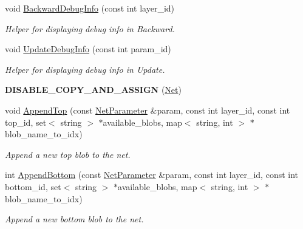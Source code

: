 \begin{DoxyCompactItemize}
\mbox{\label{classcaffe_1_1_net_a0ddec52928f0488e1b1136a0d72db0a1}} 
void \mbox{\hyperlink{classcaffe_1_1_net_a0ddec52928f0488e1b1136a0d72db0a1}{Backward\+Debug\+Info}} (const int layer\+\_\+id)
\begin{DoxyCompactList}\small\item\em Helper for displaying debug info in Backward. \end{DoxyCompactList}\item 
\mbox{\label{classcaffe_1_1_net_a93a439c92c9218f1dfff16f76d617faa}} 
void \mbox{\hyperlink{classcaffe_1_1_net_a93a439c92c9218f1dfff16f76d617faa}{Update\+Debug\+Info}} (const int param\+\_\+id)
\begin{DoxyCompactList}\small\item\em Helper for displaying debug info in Update. \end{DoxyCompactList}\item 
\mbox{\label{classcaffe_1_1_net_a3d52b2d075fa543e687cf61ba035a488}} 
{\bfseries D\+I\+S\+A\+B\+L\+E\+\_\+\+C\+O\+P\+Y\+\_\+\+A\+N\+D\+\_\+\+A\+S\+S\+I\+GN} (\mbox{\hyperlink{classcaffe_1_1_net}{Net}})
\item 
\mbox{\label{classcaffe_1_1_net_a3aab736bc72b29c84dc3ee765ee453c4}} 
void \mbox{\hyperlink{classcaffe_1_1_net_a3aab736bc72b29c84dc3ee765ee453c4}{Append\+Top}} (const \mbox{\hyperlink{classcaffe_1_1_net_parameter}{Net\+Parameter}} \&param, const int layer\+\_\+id, const int top\+\_\+id, set$<$ string $>$ $\ast$available\+\_\+blobs, map$<$ string, int $>$ $\ast$blob\+\_\+name\+\_\+to\+\_\+idx)
\begin{DoxyCompactList}\small\item\em Append a new top blob to the net. \end{DoxyCompactList}\item 
\mbox{\label{classcaffe_1_1_net_a6ef3482f4e882e437c81affa77d91f32}} 
int \mbox{\hyperlink{classcaffe_1_1_net_a6ef3482f4e882e437c81affa77d91f32}{Append\+Bottom}} (const \mbox{\hyperlink{classcaffe_1_1_net_parameter}{Net\+Parameter}} \&param, const int layer\+\_\+id, const int bottom\+\_\+id, set$<$ string $>$ $\ast$available\+\_\+blobs, map$<$ string, int $>$ $\ast$blob\+\_\+name\+\_\+to\+\_\+idx)
\begin{DoxyCompactList}\small\item\em Append a new bottom blob to the net. \end{DoxyCompactList}\item 

\end{DoxyCompactItemize}
